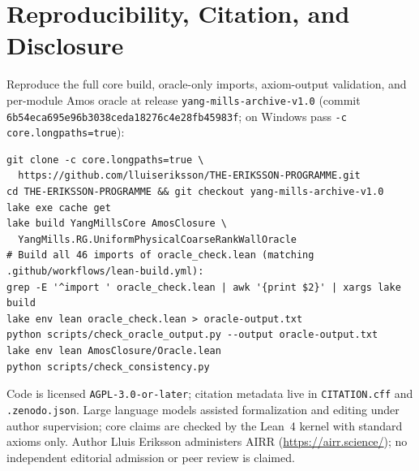 \documentclass[11pt]{article}
\begin{document}
\section{Reproducibility, Citation, and Disclosure}

Reproduce the full core build, oracle-only imports, axiom-output validation, and
per-module Amos oracle at release \texttt{yang-mills-archive-v1.0} (commit
\texttt{6b54eca695e96b3038ceda18276c4e28fb45983f}; on Windows pass
\texttt{-c core.longpaths=true}):
\begin{footnotesize}
\begin{verbatim}
git clone -c core.longpaths=true \
  https://github.com/lluiseriksson/THE-ERIKSSON-PROGRAMME.git
cd THE-ERIKSSON-PROGRAMME && git checkout yang-mills-archive-v1.0
lake exe cache get
lake build YangMillsCore AmosClosure \
  YangMills.RG.UniformPhysicalCoarseRankWallOracle
# Build all 46 imports of oracle_check.lean (matching .github/workflows/lean-build.yml):
grep -E '^import ' oracle_check.lean | awk '{print $2}' | xargs lake build
lake env lean oracle_check.lean > oracle-output.txt
python scripts/check_oracle_output.py --output oracle-output.txt
lake env lean AmosClosure/Oracle.lean
python scripts/check_consistency.py
\end{verbatim}
\end{footnotesize}
Code is licensed \texttt{AGPL-3.0-or-later}; citation metadata live in
\texttt{CITATION.cff} and \texttt{.zenodo.json}. Large language models assisted
formalization and editing under author supervision; core claims are checked by the Lean~4
kernel with standard axioms only. Author Lluis Eriksson administers AIRR
(\url{https://airr.science/}); no independent editorial admission or peer review is claimed.
\end{document}
